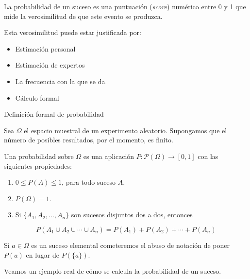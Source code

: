 \documentclass[
  letterpaper,
  DIV=11,
  numbers=noendperiod]{scrreprt}
\providecommand{\tightlist}{%
  \setlength{\itemsep}{0pt}\setlength{\parskip}{0pt}}\usepackage{longtable,booktabs,array}
\begin{document}
La probabilidad de un suceso es una puntuación (\emph{score}) numérico
entre 0 y 1 que mide la verosimilitud de que este evento se produzca.

Esta verosimilitud puede estar justificada por:

\begin{itemize}
\item
  Estimación personal
\item
  Estimación de expertos
\item
  La frecuencia con la que se da
\item
  Cálculo formal
\end{itemize}

\begin{Definicion}{Definición formal de probabilidad}{}

Sea \(\Omega\) el espacio muestral de un experimento aleatorio.
Supongamos que el número de posibles resultados, por el momento, es
finito.

Una probabilidad sobre \(\Omega\) es una aplicación
\(P:\mathcal{P}(\Omega)\to [0,1]\) con las siguientes propiedades:

\begin{enumerate}
\def\labelenumi{\arabic{enumi}.}
\tightlist
\item
  \(0\leq P(A)\leq 1\), para todo suceso \(A\).
\item
  \(P(\Omega)=1\).
\item
  Si \(\{A_1,A_2,\ldots,A_n\}\) son sucesos disjuntos dos a dos,
  entonces
\end{enumerate}

\[
P(A_1\cup A_2\cup \cdots \cup A_n)=P(A_1)+P(A_2)+\cdots +P(A_n)
\]

Si \(a\in \Omega\) es un suceso elemental cometeremos el abuso de
notación de poner \(P(a)\) en lugar de \(P(\{a\})\).

\end{Definicion}

Veamos un ejemplo real de cómo se calcula la probabilidad de un suceso.
\end{document}
